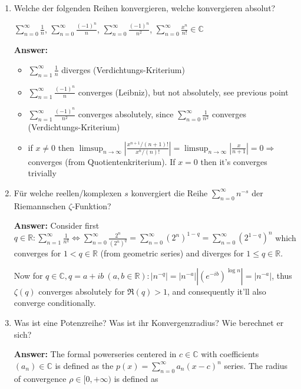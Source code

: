 \documentclass[11pt]{article}
\newcommand{\abs}[1]{\left|#1\right|}
\newcommand{\sumn}[4]{\sum_{#1=#2}^{#3}{#4}}
\newcommand{\RR}[0]{\mathbb{R}}
\newcommand{\CC}[0]{\mathbb{C}}
\begin{document}
\begin{enumerate}
    \item  Welche der folgenden Reihen konvergieren, welche konvergieren absolut?
    \begin{center}
        $\sum_{n=0}^\infty {\frac{1}{n}}$, $\sum_{n=0}^\infty \frac{(-1)^n}{n}$, $\sum_{n=0}^\infty \frac{(-1)^n}{n^2}$, $\sum_{n=0}^\infty \frac{x^n}{n!} \in \mathbb{C}$
    \end{center}

    \textbf{Answer:}
    \begin{itemize}
        \item $\sum_{n=1}^\infty {\frac{1}{n}}$ diverges (Verdichtungs-Kriterium)
        \item $\sum_{n=1}^\infty \frac{(-1)^n}{n}$ converges (Leibniz), but not absolutely, see previous point
        \item $\sum_{n=1}^\infty \frac{(-1)^n}{n^2}$ converges absolutely, since $\sum_{n=0}^\infty \frac{1}{n^2}$ converges (Verdichtungs-Kriterium)
        \item if $x\neq0$ then $\limsup_{n\to\infty}\abs{\frac{x^{n+1}/(n+1)!}{x^{n}/(n)!}} = \limsup_{n\to\infty}\abs{\frac{x}{n+1}} = 0 \Rightarrow$ converges (from Quotientenkriterium). If $x=0$ then it's converges trivially
    \end{itemize}
    \item  Für welche reellen/komplexen $s$ konvergiert die Reihe $\sum_{n=0}^\infty n^{-s}$ der Riemannschen
    $\zeta$-Funktion?

    \textbf{Answer:} Consider first $q\in \mathbb{R}: \sumn{n}{1}{\infty}{\frac{1}{n^q}} \Leftrightarrow \sumn{n}{0}{\infty}{\frac{2^n}{(2^n)^q}} = \sumn{n}{0}{\infty}{(2^n)^{1-q}} = \sumn{n}{0}{\infty}{(2^{1-q})^n}$ which converges for $1 < q \in \mathbb{R}$ (from geometric series) and diverges for $1 \le q \in \mathbb{R}$.

    Now for $q\in\CC, q = a + ib~(a, b\in\RR)\colon \abs{n^{-q}} =\abs{n^{-a}} \abs{(e^{-ib})^{\log{n}}} = \abs{n^{-a}}$, thus $\zeta(q)$ converges absolutely for $\Re(q) > 1$, and consequently it'll also converge conditionally.

    \item  Was ist eine Potenzreihe? Was ist ihr Konvergenzradius? Wie berechnet er sich?
    
    \textbf{Answer:} The formal powerseries centered in $c\in\CC$ with coefficients $(a_n) \in \CC$ is defined as the $p(x) = \sumn{n}{0}{\infty}{a_n(x-c)^n}$ series. The radius of convergence $\rho \in [0, +\infty)$ is defined as 


\end{enumerate}
\end{document}
